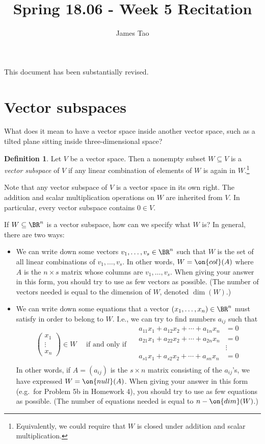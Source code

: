 \documentclass[10pt]{amsart}
\title{Spring 18.06 - Week 5 Recitation}
\author{James Tao}
\theoremstyle{mythm}
\theoremstyle{definition}
\newtheorem*{defn}{Definition}
\theoremstyle{myrmk}
\begin{document}
	\thispagestyle{fancy}
	
	This document has been substantially revised. 
	
	\section{Vector subspaces} 
	
	What does it mean to have a vector space inside another vector space, such as a tilted plane sitting inside three-dimensional space? 
	
	\begin{defn}
		Let $V$ be a vector space. Then a nonempty subset $W \subseteq V$ is a \emph{vector subspace} of $V$ if any linear combination of elements of $W$ is again in $W$.\footnote{Equivalently, we could require that $W$ is closed under addition and scalar multiplication.} 
	\end{defn}
	
	Note that any vector subspace of $V$ is a vector space in its own right. The addition and scalar multiplication operations on $W$ are inherited from $V$. In particular, every vector subspace contains $0 \in V$. 
	
	If $W \subseteq \BR^n$ is a vector subspace, how can we specify what $W$ is? In general, there are two ways: 
	\begin{itemize}
		\item We can write down some vectors $v_1, \ldots, v_s \in \BR^n$ such that $W$ is the set of all linear combinations of $v_1, \ldots, v_s$. In other words, $W = \on{col}(A)$ where $A$ is the $n \times s$ matrix whose columns are $v_1, \ldots, v_s$. When giving your answer in this form, you should try to use as few vectors as possible. (The number of vectors needed is equal to the dimension of $W$, denoted $\dim(W)$.) 
		\item We can write down some equations that a vector $(x_1, \ldots, x_n) \in \BR^n$ must satisfy in order to belong to $W$. I.e., we can try to find numbers $a_{ij}$ such that 
		\[
		\begin{pmatrix}
		x_1 \\ \vdots \\ x_n 
		\end{pmatrix} \in W \quad \text{ if and only if } \quad \begin{aligned}
		a_{11}x_1 + a_{12}x_2 + \cdots + a_{1n}x_n &= 0 \\
		a_{21}x_1 + a_{22}x_2 + \cdots + a_{2n}x_n &= 0 \\ 
		&\vdots \\
		a_{s1}x_1 + a_{s2}x_2 + \cdots + a_{sn}x_n &= 0 \\
		\end{aligned}
		\]
		In other words, if $A = (a_{ij})$ is the $s \times n$ matrix consisting of the $a_{ij}$'s, we have expressed $W = \on{null}(A)$. 
		When giving your answer in this form (e.g.\ for Problem 5b in Homework 4), you should try to use as few equations as possible. (The number of equations needed is equal to $n - \on{dim}(W)$.) 
	\end{itemize}
	
\end{document}
